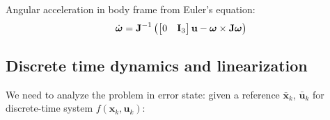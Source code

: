 Angular acceleration in body frame from Euler's equation:
\begin{equation}
    \dot{\text{\boldmath$\omega$}} = \textbf{J}^{-1}\left(\begin{bmatrix}
        0 & \textbf{I}_3
    \end{bmatrix} \textbf{u} - \text{\boldmath$\omega$} \times \textbf{J}\text{\boldmath$\omega$} \right)
\end{equation}

\subsection{Discrete time dynamics and linearization}
We need to analyze the problem in error state: given a reference $\bar{\textbf{x}}_k$, $\bar{\textbf{u}}_k$ for discrete-time system $f(\textbf{x}_k,\textbf{u}_k)$:

